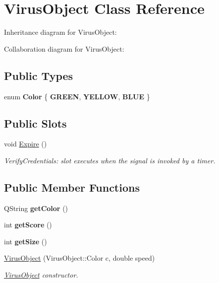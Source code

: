 \hypertarget{classVirusObject}{}\section{Virus\+Object Class Reference}
\label{classVirusObject}


Inheritance diagram for Virus\+Object\+:


Collaboration diagram for Virus\+Object\+:
\subsection*{Public Types}
\begin{DoxyCompactItemize}
\item 
\mbox{\label{classVirusObject_aaa5f4d0c62dc440075a3a3bdf2eb5638}} 
enum {\bfseries Color} \{ {\bfseries G\+R\+E\+EN}, 
{\bfseries Y\+E\+L\+L\+OW}, 
{\bfseries B\+L\+UE}
 \}
\end{DoxyCompactItemize}
\subsection*{Public Slots}
\begin{DoxyCompactItemize}
\item 
void \hyperlink{classVirusObject_a90bb071dbf5c8ec544466f1e5b8fa7ac}{Expire} ()
\begin{DoxyCompactList}\small\item\em Verify\+Credentials\+: slot executes when the signal is invoked by a timer. \end{DoxyCompactList}\end{DoxyCompactItemize}
\subsection*{Public Member Functions}
\begin{DoxyCompactItemize}
\item 
\mbox{\label{classVirusObject_a29dc5c7a7acb2a8c29c3e22ea0350035}} 
Q\+String {\bfseries get\+Color} ()
\item 
\mbox{\label{classVirusObject_aaff81b3029f927fbce8e066a982da97b}} 
int {\bfseries get\+Score} ()
\item 
\mbox{\label{classVirusObject_a0c2e1ad387f8888977c7c9d4c3d51ece}} 
int {\bfseries get\+Size} ()
\item 
\hyperlink{classVirusObject_ac37483ccb4d3814c67adf78e6497f667}{Virus\+Object} (Virus\+Object\+::\+Color c, double speed)
\begin{DoxyCompactList}\small\item\em \hyperlink{classVirusObject}{Virus\+Object} constructor. \end{DoxyCompactList}\end{DoxyCompactItemize}
